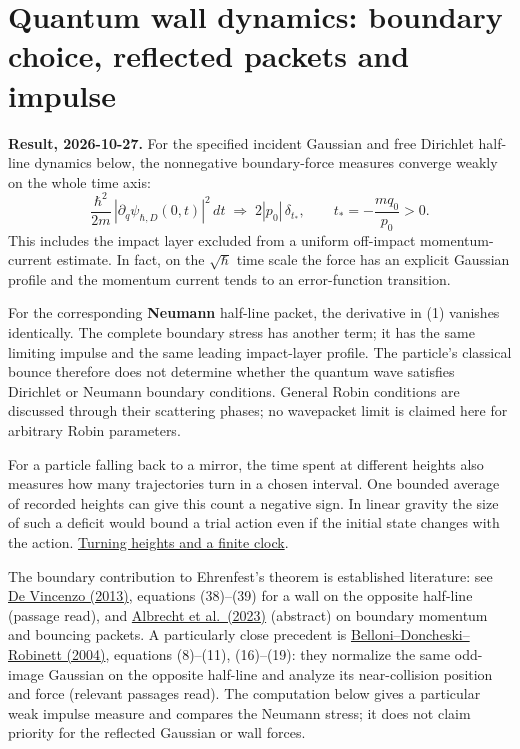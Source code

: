 \documentclass[11pt,a4paper]{article}
\begin{document}
\section{Quantum wall dynamics: boundary choice, reflected packets and
impulse}\label{quantum-wall-dynamics-boundary-choice-reflected-packets-and-impulse}

\textbf{Result, 2026-10-27.} For the specified incident Gaussian and
free Dirichlet half-line dynamics below, the nonnegative boundary-force
measures converge weakly on the whole time axis: \[
 \frac{\hbar^2}{2m}\,|\partial_q\psi_{\hbar,D}(0,t)|^2\,dt
 \;\Longrightarrow\;2|p_0|\,\delta_{t_*},
 \qquad t_*=-\frac{mq_0}{p_0}>0.\tag{1}
\] This includes the impact layer excluded from a uniform off-impact
momentum-current estimate. In fact, on the \(\sqrt\hbar\) time scale the
force has an explicit Gaussian profile and the momentum current tends to
an error-function transition.

For the corresponding \textbf{Neumann} half-line packet, the derivative
in (1) vanishes identically. The complete boundary stress has another
term; it has the same limiting impulse and the same leading impact-layer
profile. The particle's classical bounce therefore does not determine
whether the quantum wave satisfies Dirichlet or Neumann boundary
conditions. General Robin conditions are discussed through their
scattering phases; no wavepacket limit is claimed here for arbitrary
Robin parameters.

For a particle falling back to a mirror, the time spent at different
heights also measures how many trajectories turn in a chosen interval.
One bounded average of recorded heights can give this count a negative
sign. In linear gravity the size of such a deficit would bound a trial
action even if the initial state changes with the action.
\hyperref[counting-turning-heights-from-neutron-positions]{Turning
heights and a finite clock}.

The boundary contribution to Ehrenfest's theorem is established
literature: see
\href{https://www.scielo.org.mx/scielo.php?pid=S1870-35422013000200001&script=sci_arttext}{De
Vincenzo (2013)}, equations (38)--(39) for a wall on the opposite
half-line (passage read), and
\href{https://arxiv.org/abs/2206.07531}{Albrecht et al.~(2023)}
(abstract) on boundary momentum and bouncing packets. A particularly
close precedent is
\href{https://arxiv.org/pdf/quant-ph/0408182}{Belloni--Doncheski--Robinett
(2004)}, equations (8)--(11), (16)--(19): they normalize the same
odd-image Gaussian on the opposite half-line and analyze its
near-collision position and force (relevant passages read). The
computation below gives a particular weak impulse measure and compares
the Neumann stress; it does not claim priority for the reflected
Gaussian or wall forces.
\end{document}
